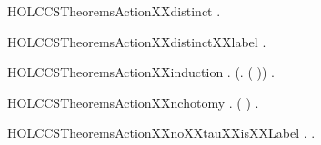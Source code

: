 \newcommand{\HOLCCSTheoremsActionXXOneOne}{\UseVerbatim{HOLCCSTheoremsActionXXOneOne}}
\begin{SaveVerbatim}{HOLCCSTheoremsActionXXdistinct}
\HOLTokenTurnstile{} \HOLSymConst{\HOLTokenForall{}}. \HOLConst{\ensuremath{\tau}} \HOLSymConst{\HOLTokenNotEqual{}}  
\end{SaveVerbatim}
\newcommand{\HOLCCSTheoremsActionXXdistinct}{\UseVerbatim{HOLCCSTheoremsActionXXdistinct}}
\begin{SaveVerbatim}{HOLCCSTheoremsActionXXdistinctXXlabel}
\HOLTokenTurnstile{} \HOLSymConst{\HOLTokenForall{}}.   \HOLSymConst{\HOLTokenNotEqual{}} \HOLConst{\ensuremath{\tau}}
\end{SaveVerbatim}
\newcommand{\HOLCCSTheoremsActionXXdistinctXXlabel}{\UseVerbatim{HOLCCSTheoremsActionXXdistinctXXlabel}}
\begin{SaveVerbatim}{HOLCCSTheoremsActionXXinduction}
\HOLTokenTurnstile{} \HOLSymConst{\HOLTokenForall{}}.  \HOLConst{\ensuremath{\tau}} \HOLSymConst{\HOLTokenConj{}} (\HOLSymConst{\HOLTokenForall{}}.  ( )) \HOLSymConst{\HOLTokenImp{}} \HOLSymConst{\HOLTokenForall{}}.  
\end{SaveVerbatim}
\newcommand{\HOLCCSTheoremsActionXXinduction}{\UseVerbatim{HOLCCSTheoremsActionXXinduction}}
\begin{SaveVerbatim}{HOLCCSTheoremsActionXXnchotomy}
\HOLTokenTurnstile{} \HOLSymConst{\HOLTokenForall{}}. ( \HOLSymConst{=} \HOLConst{\ensuremath{\tau}}) \HOLSymConst{\HOLTokenDisj{}} \HOLSymConst{\HOLTokenExists{}}.  \HOLSymConst{=}  
\end{SaveVerbatim}
\newcommand{\HOLCCSTheoremsActionXXnchotomy}{\UseVerbatim{HOLCCSTheoremsActionXXnchotomy}}
\begin{SaveVerbatim}{HOLCCSTheoremsActionXXnoXXtauXXisXXLabel}
\HOLTokenTurnstile{} \HOLSymConst{\HOLTokenForall{}}.  \HOLSymConst{\HOLTokenNotEqual{}} \HOLConst{\ensuremath{\tau}} \HOLSymConst{\HOLTokenImp{}} \HOLSymConst{\HOLTokenExists{}}.  \HOLSymConst{=}  
\end{SaveVerbatim}
\newcommand{\HOLCCSTheoremsActionXXnoXXtauXXisXXLabel}{\UseVerbatim{HOLCCSTheoremsActionXXnoXXtauXXisXXLabel}}
